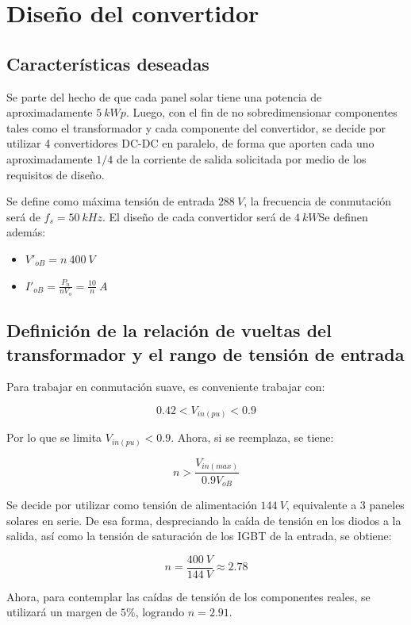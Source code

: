 \clearpage


\section{Diseño del convertidor}

\subsection{Características deseadas}

Se parte del hecho de que cada panel solar tiene una potencia de aproximadamente $5 \ kWp$. Luego, con el fin de no sobredimensionar componentes tales como el transformador y cada componente del convertidor, se decide por utilizar 4 convertidores DC-DC en paralelo, de forma que aporten cada uno aproximadamente $1/4$ de la corriente de salida solicitada por medio de los requisitos de diseño. 

Se define como máxima tensión de entrada $288 \ V$, la frecuencia de conmutación será de $f_s=50 \ kHz$. El diseño de cada convertidor será de $4 \ kW$Se definen además:

\begin{itemize}
	\item $V'_{oB}=n \ 400 \ V$
	\item $I'_{oB}= \frac{P_n}{nV_o}=\frac{10}{n} \ A$
\end{itemize}

\subsection{Definición de la relación de vueltas del transformador y el rango de tensión de entrada}

Para trabajar en conmutación suave, es conveniente trabajar con:

$$
0.42 < V_{in(pu)} < 0.9
$$

Por lo que se limita $V_{in(pu)} < 0.9$. Ahora, si se reemplaza, se tiene:

$$
n>\frac{V_{in(max)}}{0.9V_{oB}}
$$


Se decide por utilizar como tensión de alimentación $144 \ V$, equivalente a 3 paneles solares en serie. De esa forma, despreciando la caída de tensión en los diodos a la salida, así como la tensión de saturación de los IGBT de la entrada, se obtiene:

$$
n=\frac{400 \ V}{144 \ V} \approx 2.78
$$

Ahora, para contemplar las caídas de tensión de los componentes reales, se utilizará un margen de $5 \%$, logrando $n=2.91$.

